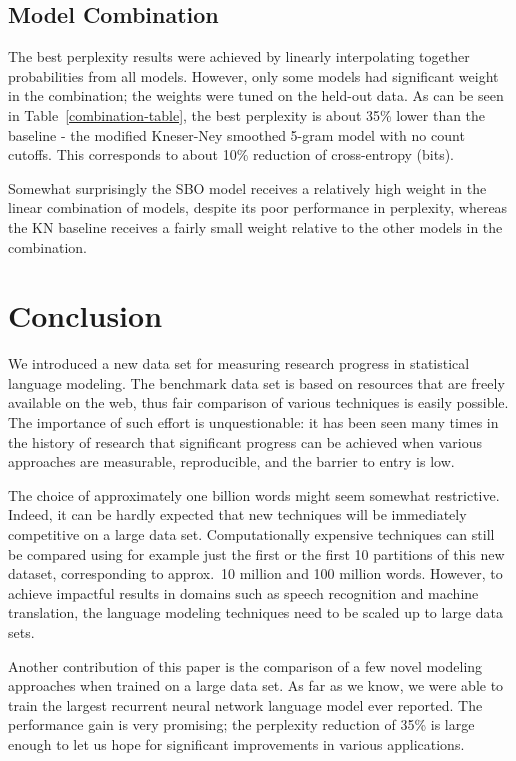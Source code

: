 \documentclass[11pt,letterpaper]{article}
\begin{document}
\subsection{Model Combination}

The best perplexity results were achieved by linearly interpolating together probabilities from
all models. However, only some models had significant weight in the combination; the weights
were tuned on the held-out data. As can be seen in Table~\ref{combination-table}, the best
perplexity is about 35\% lower than the baseline - the modified Kneser-Ney smoothed 5-gram
model with no count cutoffs. This corresponds to about 10\% reduction of cross-entropy (bits).

Somewhat surprisingly the SBO model receives a relatively high weight in the linear combination of
models, despite its poor performance in perplexity, whereas the KN baseline receives a fairly small
weight relative to the other models in the combination.

\section{Conclusion}

We introduced a new data set for measuring research progress in statistical language modeling.
The benchmark data set is based on resources that are freely available on the web, thus fair comparison
of various techniques is easily possible. The importance of such effort is unquestionable: it
has been seen many times in the history of research that significant progress can be achieved when
various approaches are measurable, reproducible, and the barrier to entry is low.

The choice of approximately one billion words might seem somewhat restrictive. Indeed, it can be
hardly expected that new techniques will be immediately competitive on a large data set.
Computationally expensive techniques can still be compared using for example
just the first or the first 10 partitions of this new dataset, corresponding to approx.~10 million and 100 million words. However, to achieve impactful results
in domains such as speech recognition and machine translation, the language modeling
techniques need to be scaled up to large data sets.

Another contribution of this paper is the comparison of a few novel modeling approaches
when trained on a large data set. As far as we know, we were able to train the largest
recurrent neural network language model ever reported. The performance gain is very promising;
the perplexity reduction of 35\% is large enough to let us hope for significant improvements in
various applications.
\end{document}
